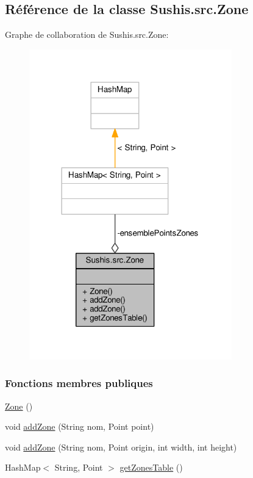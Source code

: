 \hypertarget{classSushis_1_1src_1_1Zone}{}\subsection{Référence de la classe Sushis.\+src.\+Zone}
\label{classSushis_1_1src_1_1Zone}


Graphe de collaboration de Sushis.\+src.\+Zone\+:\nopagebreak
\begin{figure}[H]
\begin{center}
\leavevmode
\includegraphics[width=249pt]{classSushis_1_1src_1_1Zone__coll__graph}
\end{center}
\end{figure}
\subsubsection*{Fonctions membres publiques}
\begin{DoxyCompactItemize}
\item 
\hyperlink{classSushis_1_1src_1_1Zone_acde89dfbe4e9cf586a64de0277b5ff9e}{Zone} ()
\item 
void \hyperlink{classSushis_1_1src_1_1Zone_a737a8de9825dfe720a1aaf7da7069069}{add\+Zone} (String nom, Point point)
\item 
void \hyperlink{classSushis_1_1src_1_1Zone_ad4b9b05eeed0db2dcb1c3c4dc2033f10}{add\+Zone} (String nom, Point origin, int width, int height)
\item 
Hash\+Map$<$ String, Point $>$ \hyperlink{classSushis_1_1src_1_1Zone_a6e9d430eff8639b97f0211d8aaa5fad6}{get\+Zones\+Table} ()
\end{DoxyCompactItemize}
